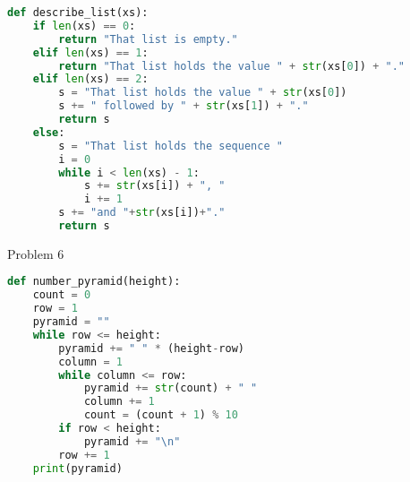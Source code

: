 \documentclass{article}
\begin{document}
\begin{lstlisting}[language=Python]
def describe_list(xs):
    if len(xs) == 0:
        return "That list is empty."
    elif len(xs) == 1:
        return "That list holds the value " + str(xs[0]) + "."
    elif len(xs) == 2:
        s = "That list holds the value " + str(xs[0])
        s += " followed by " + str(xs[1]) + "."
        return s
    else:
        s = "That list holds the sequence "
        i = 0
        while i < len(xs) - 1:
            s += str(xs[i]) + ", "
            i += 1
        s += "and "+str(xs[i])+"."
        return s
\end{lstlisting}


\newpage
Problem 6

\begin{lstlisting}[language=Python]
def number_pyramid(height):
    count = 0
    row = 1
    pyramid = ""
    while row <= height:
        pyramid += " " * (height-row)
        column = 1
        while column <= row:
            pyramid += str(count) + " "
            column += 1
            count = (count + 1) % 10
        if row < height:
            pyramid += "\n"
        row += 1
    print(pyramid)
\end{lstlisting}
\end{document}
